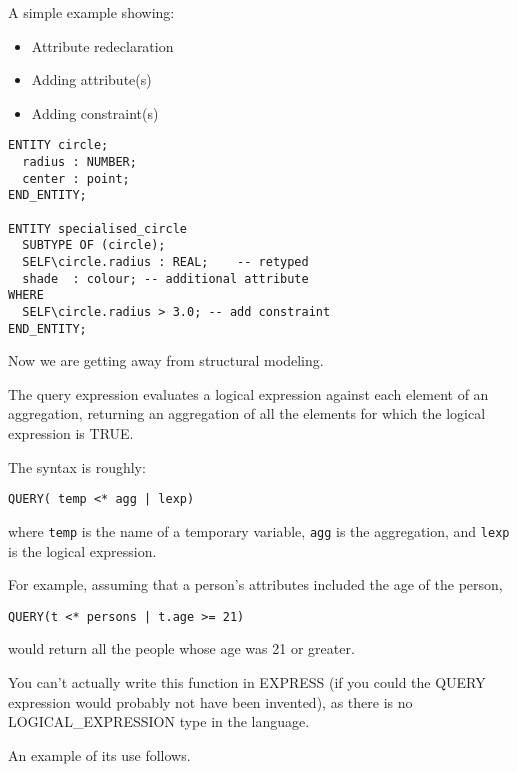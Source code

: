 \begin{remarks}
\remintro


 A simple example showing:
\begin{itemize}
\item Attribute redeclaration
\item Adding attribute(s)
\item Adding constraint(s)
\end{itemize}

\remend
\end{remarks}


\begin{verbatim}
ENTITY circle;
  radius : NUMBER;
  center : point;
END_ENTITY;

ENTITY specialised_circle
  SUBTYPE OF (circle);
  SELF\circle.radius : REAL;    -- retyped 
  shade  : colour; -- additional attribute
WHERE
  SELF\circle.radius > 3.0; -- add constraint 
END_ENTITY;
\end{verbatim}

\begin{remarks}
\remintro


    Now we are getting away from structural modeling.

\remend
\end{remarks}


    The query expression evaluates a logical expression against each element
of an aggregation, returning an aggregation of all the elements for which
the logical expression is TRUE.

The syntax is roughly:
\begin{verbatim}
QUERY( temp <* agg | lexp)
\end{verbatim}
where \verb|temp| is the name of a temporary variable, \verb|agg| is the 
aggregation, and \verb|lexp| is the logical expression.

For example, assuming that a person's attributes included the age of the person,
\begin{verbatim}
QUERY(t <* persons | t.age >= 21)
\end{verbatim}
would return all the people whose age was 21 or greater. 

\begin{remarks}
\remintro


You can't actually write this function in EXPRESS (if you could the
QUERY expression would probably not have been invented), as there is 
no LOGICAL\_EXPRESSION type in the language.

    An example of its use follows.

\remend
\end{remarks}

